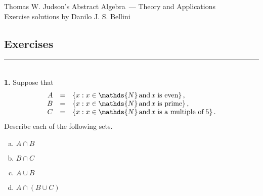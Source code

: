 \documentclass{article}[10pt]
\newenvironment{exercise}[1]
    {\noindent\rule{2cm}{0.4pt} \\
     \textbf{#1.}}
    {}
\begin{document}
\begin{center}
  {\Large Thomas W. Judson's
          Abstract Algebra~--- Theory and Applications} \\
  {\large Exercise solutions by Danilo J. S. Bellini} \\
\end{center}


\setcounter{section}{1}\setcounter{subsection}{2}
\subsection{Exercises}


\begin{exercise}{1}
  Suppose that
  \[
    \begin{array}{>{\displaystyle}r
                  >{\displaystyle}c
                  >{\displaystyle}l}
      A & = & \left\{ x : x \in \mathds{N} \operatorname{and}
                          x \;\text{is even} \right\}, \\
      B & = & \left\{ x : x \in \mathds{N} \operatorname{and}
                          x \;\text{is prime} \right\}, \\
      C & = & \left\{ x : x \in \mathds{N} \operatorname{and}
                          x \;\text{is a multiple of}\; 5 \right\}. \\
    \end{array}
  \]
  Describe each of the following sets.
  \begin{enumerate}[(a)]
    \item $A \cap B$
    \item $B \cap C$
    \item $A \cup B$
    \item $A \cap \left( B \cup C \right)$
  \end{enumerate}


\end{exercise}
\end{document}
